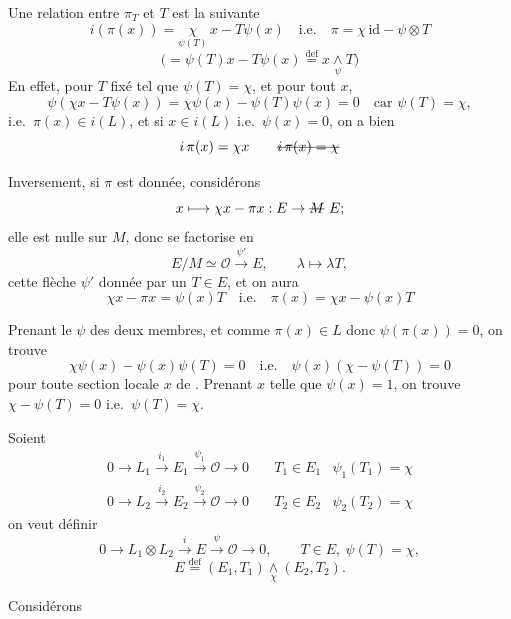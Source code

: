 \documentclass[11pt,a4paper]{article}
\begin{document}
Une relation entre $\pi_T$ et $T$ est la suivante
\[
  i(\pi(x)) = \underset{\psi(T)}{\chi}\, x - T\psi(x) \quad \text{i.e.} \quad \pi = \chi\,\mathrm{id} - \psi \otimes T
\]
\[
  \bigl(= \psi(T)x - T\psi(x) \overset{\mathrm{def}}{=} x \underset{\psi}{\wedge} T\bigr)
\]
En effet, pour $T$ fixé tel que $\psi(T) = \chi$, et pour tout $x$,
\[
  \psi(\chi x - T\psi(x)) = \chi\psi(x) - \psi(T)\psi(x) = 0 \quad \text{car } \psi(T) = \chi,
\]
i.e.\ $\pi(x) \in i(L)$, et si $x \in i(L)$ i.e.\ $\psi(x) = 0$, on a bien
\[
  i\,\pi(x) = \chi x \qquad \text{\struck{$i\,\pi(x) = \chi$}}
\]

Inversement, si $\pi$ est donnée, considérons
\[
  x \longmapsto \chi x - \pi x : E \to \text{\struck{$M$}}\ E ;
\]
elle est nulle sur $M$, donc se factorise en
\[
  E/M \simeq \mathcal{O} \xrightarrow{\psi'} E, \qquad \lambda \mapsto \lambda T,
\]
cette flèche $\psi'$ donnée par un $T \in E$, et on aura
\[
  \chi x - \pi x = \psi(x) T \quad \text{i.e.} \quad \boxed{\pi(x) = \chi x - \psi(x) T}
\]

Prenant le $\psi$ des deux membres, et comme $\pi(x) \in L$ donc $\psi(\pi(x)) = 0$, on trouve
\[
  \chi\psi(x) - \psi(x)\psi(T) = 0 \quad \text{i.e.} \quad \psi(x)(\chi - \psi(T)) = 0
\]
pour toute section locale $x$ de . Prenant $x$ telle que $\psi(x) = 1$, on trouve $\chi - \psi(T) = 0$ i.e.\ $\psi(T) = \chi$.

Soient
\[
  \begin{array}{lll}
  0 \to L_1 \xrightarrow{i_1} E_1 \xrightarrow{\psi_1} \mathcal{O} \to 0 & \quad T_1 \in E_1 & \psi_1(T_1) = \chi \\
  0 \to L_2 \xrightarrow{i_2} E_2 \xrightarrow{\psi_2} \mathcal{O} \to 0 & \quad T_2 \in E_2 & \psi_2(T_2) = \chi
  \end{array}
\]
on veut définir
\[
  0 \to L_1 \otimes L_2 \xrightarrow{i} E \xrightarrow{\psi} \mathcal{O} \to 0,
  \qquad T \in E,\ \psi(T) = \chi,
\]
\[
  E \overset{\mathrm{def}}{=} (E_1, T_1) \underset{\chi}{\wedge} (E_2, T_2).
\]

Considérons

\end{document}
